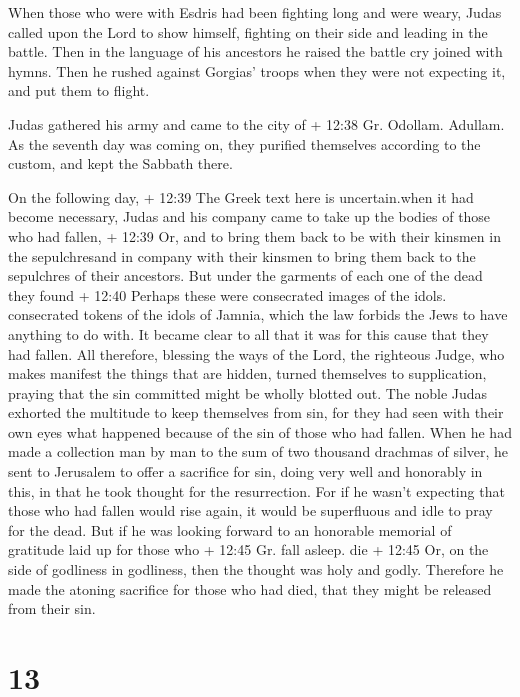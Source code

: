  When those who were with Esdris had been fighting long and
were weary, Judas called upon the Lord to show himself, fighting on
their side and leading in the battle.  Then in the language
of his ancestors he raised the battle cry joined with hymns. Then he
rushed against Gorgias' troops when they were not expecting it, and put
them to flight.

 Judas gathered his army and came to the city of + 12:38
Gr. Odollam. Adullam. As the seventh day was coming on, they purified
themselves according to the custom, and kept the Sabbath there.

 On the following day, + 12:39 The Greek text here is
uncertain.when it had become necessary, Judas and his company came to
take up the bodies of those who had fallen, + 12:39 Or, and to bring
them back to be with their kinsmen in the sepulchresand in company with
their kinsmen to bring them back to the sepulchres of their ancestors.
 But under the garments of each one of the dead they found
+ 12:40 Perhaps these were consecrated images of the idols. consecrated
tokens of the idols of Jamnia, which the law forbids the Jews to have
anything to do with. It became clear to all that it was for this cause
that they had fallen.  All therefore, blessing the ways of
the Lord, the righteous Judge, who makes manifest the things that are
hidden,  turned themselves to supplication, praying that
the sin committed might be wholly blotted out. The noble Judas exhorted
the multitude to keep themselves from sin, for they had seen with their
own eyes what happened because of the sin of those who had fallen.
 When he had made a collection man by man to the sum of two
thousand drachmas of silver, he sent to Jerusalem to offer a sacrifice
for sin, doing very well and honorably in this, in that he took thought
for the resurrection.  For if he wasn't expecting that
those who had fallen would rise again, it would be superfluous and idle
to pray for the dead.  But if he was looking forward to an
honorable memorial of gratitude laid up for those who + 12:45 Gr. fall
asleep. die + 12:45 Or, on the side of godliness in godliness, then the
thought was holy and godly. Therefore he made the atoning sacrifice for
those who had died, that they might be released from their sin.

\hypertarget{section-11}{%
\section{13}\label{section-11}}

